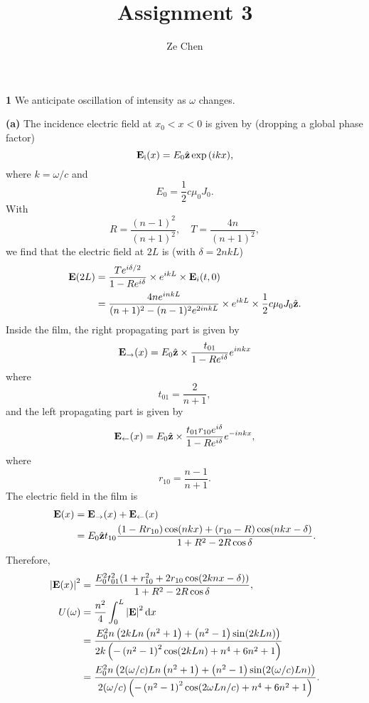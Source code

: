 \documentclass{article}
\title{Assignment 3}
\author{Ze Chen}
\makeatletter
\newcommand*{\shifttext}[1]{%
  \settowidth{\@tempdima}{#1}%
  \hspace{-\@tempdima}#1%
}
\newcommand{\plabel}[1]{%
\shifttext{\textbf{#1}\quad}%
}
\makeatother
\begin{document}
\maketitle

\plabel{1}%
We anticipate oscillation of intensity as $\omega$ changes.

\plabel{(a)}%
The incidence electric field at $x_0 < x < 0$ is given by (dropping a global phase factor)
\[ \vb{E}_{\mathrm{i}}(x) = E_0 \hat{\vb{z}} \exp \qty(i k x), \]
where $k = \omega/c$ and
\[ E_0  = \frac{1}{2} c \mu_0 J_0. \]
With
\[ R = \frac{(n-1)^2}{(n+1)^2},\quad T = \frac{4n}{(n+1)^2}, \]
we find that the electric field at $2L$ is (with $\delta = 2nkL$)
\begin{align*}
    \vb{E}(2L) &= \frac{T e^{i\delta/2}}{1 - R e^{i\delta}} \times e^{ikL} \times \vb{E}_i(t,0) \\
    &= \frac{4n e^{inkL}}{(n+1)^2 - (n-1)^2 e^{2inkL}} \times e^{ikL} \times \frac{1}{2} c \mu_0 J_0 \hat{\vb{z}}.
\end{align*}
Inside the film, the right propagating part is given by
\begin{align*}
    \vb{E}_{\rightarrow}(x) = E_0 \hat{\vb{z}} \times \frac{t_{01}}{1 - R e^{i\delta}} e^{inkx}
\end{align*}
where
\[ t_{01} = \frac{2}{n+1}, \]
and the left propagating part is given by
\begin{align*}
    \vb{E}_{\leftarrow}(x) = E_0 \hat{\vb{z}} \times \frac{t_{01} r_{10} e^{i\delta}}{1 - R e^{i\delta}} e^{-inkx},
\end{align*}
where
\[ r_{10} = \frac{n-1}{n+1}. \]
The electric field in the film is
\begin{align*}
    \vb{E}(x) &= \vb{E}_{\rightarrow}(x) + \vb{E}_{\leftarrow}(x) \\
    &= E_0 \hat{\vb{z}} t_{10} \frac{(1-R r_{10}) \cos(n k x) + (r_{10} - R)\cos(n k x - \delta)}{1 + R^2 - 2 R \cos\delta}.
\end{align*}
Therefore,
\begin{align*}
    \abs{\vb{E}(x)}^2 &= \frac{E_0^2 t_{01}^2(1 + r_{10}^2 + 2r_{10} \cos(2knx - \delta))}{1+R^2 - 2R\cos\delta}, \\
    U(\omega) &= \frac{n^2}{4} \int_0^L \abs{\vb{E}}^2 \dd{x} \\
    &= \frac{E_0^2 n \left(2 k L n \left(n^2+1\right)+\left(n^2-1\right) \sin (2 k L n)\right)}{2 k \left(-\left(n^2-1\right)^2 \cos (2 k L n)+n^4+6 n^2+1\right)} \\
    &= \frac{E_0^2 n \left(2 (\omega/c) L n \left(n^2+1\right)+\left(n^2-1\right) \sin (2 (\omega/c) L n)\right)}{2 (\omega/c) \left(-\left(n^2-1\right)^2 \cos (2 \omega L n/c)+n^4+6 n^2+1\right)}.
\end{align*}
\end{document}

